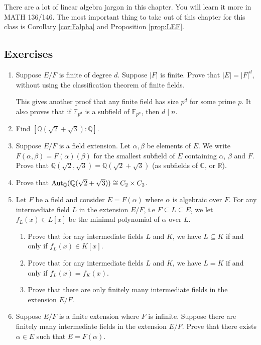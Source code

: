 \documentclass{article}
\def\Aut{{\rm Aut}}
\def\R{{\mathbb R}}
\def\F{{\mathbb F}}
\def\Q{{\mathbb Q}}
\def\F{{\mathbb F}}
\def\Q{{\mathbb Q}}
\def\C{{\mathbb C}}
\begin{document}
There are a lot of linear algebra jargon in this chapter. You will learn it more in MATH 136/146. The most important thing to take out of this chapter for this class is Corollary \ref{cor:Falpha} and Proposition \ref{prop:LEF}.

\subsection*{Exercises}
\begin{enumerate}[\thesection .1]
    \item Suppose $E/F$ is finite of degree $d$. Suppose $|F|$ is finite. Prove that $|E| = |F|^d$, without using the classification theorem of finite fields. 
    
    This gives another proof that any finite field has size $p^d$ for some prime $p$. It also proves that if $\F_{p^d}$ is a subfield of $\F_{p^n}$, then $d\mid n$.
    \item Find $[\Q(\sqrt{2} + \sqrt{3}):\Q]$. 
    \item Suppose $E/F$ is a field extension. Let $\alpha,\beta$ be elements of $E$. We write $F(\alpha,\beta) = F(\alpha)(\beta)$ for the smallest subfield of $E$ containing $\alpha$, $\beta$ and $F$. Prove that $\Q(\sqrt{2}, \sqrt{3}) = \Q(\sqrt{2}+\sqrt{3})$ (as subfields of $\C$, or $\R$).
    \item Prove that $\Aut_\Q(\Q(\sqrt{2}+\sqrt{3})) \cong C_2\times C_2$.
    \item Let $F$ be a field and consider $E = F(\alpha)$ where $\alpha$ is algebraic over $F$. For any intermediate field $L$  in the extension $E/F$, i.e $F\subseteq L\subseteq E$, we let $f_L(x)\in L[x]$ be the minimal polynomial of $\alpha$ over $L$.
    \begin{enumerate}
        \item Prove that for any intermediate fields $L$ and $K$, we have $L\subseteq K$ if and only if $f_L(x) \in K[x]$.
        \item Prove that for any intermediate fields $L$ and $K$, we have $L= K$ if and only if $f_L(x) = f_K(x)$.
        \item Prove that there are only finitely many intermediate fields in the extension $E/F$.
    \end{enumerate}
    \item Suppose $E/F$ is a finite extension where $F$ is infinite. Suppose there are finitely many intermediate fields in the extension $E/F$. Prove that there exists $\alpha\in E$ such that $E = F(\alpha)$.


\end{enumerate}
\end{document}
